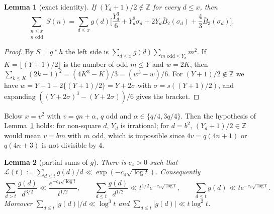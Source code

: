 \documentclass[11pt]{amsart}
\newtheorem{lemma}{Lemma}
\theoremstyle{remark}
\begin{document}
\begin{lemma}[exact identity]\label{lem:D0}
If $(Y_d+1)/2\notin\mathbb Z$ for every $d\le x$, then
\[
\sum_{\substack{n\le x\\ n\text{ odd}}}S(n)=\sum_{d\le x}g(d)\Big[\frac{Y_d^3}6+Y_d^2\sigma_d+2Y_d\bar B_2(\sigma_d)+\frac43\bar B_3(\sigma_d)\Big].
\]
\end{lemma}

\begin{proof}
By $S=g*h$ the left side is $\sum_{d\le x}g(d)\sum_{m\text{ odd}\le Y_d}m^2$. If $K=\lfloor(Y+1)/2\rfloor$ is the number of odd $m\le Y$ and $w=2K$, then $\sum_{k\le K}(2k-1)^2=(4K^3-K)/3=(w^3-w)/6$. For $(Y+1)/2\notin\mathbb Z$ we have $w=Y+1-2\{(Y+1)/2\}=Y+2\sigma$ with $\sigma=s((Y+1)/2)$, and expanding $((Y+2\sigma)^3-(Y+2\sigma))/6$ gives the bracket.
\end{proof}

Below $x=v^2$ with $v=qn+\alpha$, $q$ odd and $\alpha\in\{q/4,3q/4\}$. Then the hypothesis of Lemma~\ref{lem:D0} holds: for non-square $d$, $Y_d$ is irrational; for $d=b^2$, $(Y_d+1)/2\in\mathbb Z$ would mean $v=bm$ with $m$ odd, which is impossible since $4v=q(4n+1)$ or $q(4n+3)$ is not divisible by $4$.

\begin{lemma}[partial sums of $g$]\label{lem:D1}
There is $c_4>0$ such that $\mathcal L(t):=\sum_{d\le t}g(d)/d\ll\exp(-c_4\sqrt{\log t})$. Consequently
\[
\sum_{d>t}\frac{g(d)}{d^{3/2}}\ll\frac{e^{-c_4\sqrt{\log t}}}{t^{1/2}},\qquad\sum_{d\le t}\frac{g(d)}{d^{1/2}}\ll t^{1/2}e^{-c_4\sqrt{\log t}},\qquad\sum_{d\le t}g(d)\ll te^{-c_4\sqrt{\log t}}.
\]
Moreover $\sum_{d\le t}|g(d)|/d\ll\log^3t$ and $\sum_{d\le t}|g(d)|\ll t\log^2t$.
\end{lemma}
\end{document}
